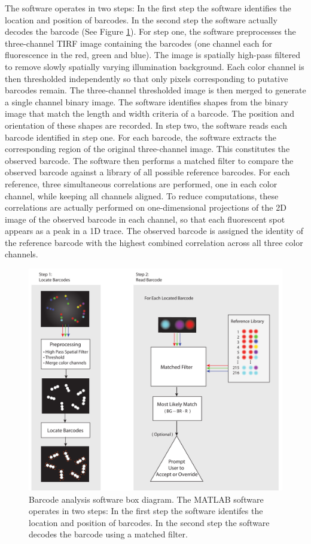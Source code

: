The software operates in two steps: In the first step the software identifies the location and position of barcodes. In the second step the software actually decodes the barcode (See Figure \ref{fig:dna_MatlabBlockDiagram}). For step one, the software preprocesses the three-channel TIRF image containing the barcodes (one channel each for fluorescence in the red, green and blue). The image is spatially high-pass filtered to remove slowly spatially varying illumination background. Each color channel is then thresholded independently so that only pixels corresponding to putative barcodes remain. The three-channel thresholded image is then merged to generate a single channel binary image. The software identifies shapes from the binary image that match the length and width criteria of a barcode. The position and orientation of these shapes are recorded. In step two, the software reads each barcode identified in step one. For each barcode, the software extracts the corresponding region of the original three-channel image. This constitutes the observed barcode. The software then performs a matched filter to compare the observed barcode against a library of all possible reference barcodes. For each reference, three simultaneous correlations are performed, one in each color channel, while keeping all channels aligned. To reduce computations, these correlations are actually performed on one-dimensional projections of the 2D image of the observed barcode in each channel, so that each fluorescent spot appears as a peak in a 1D trace. The observed barcode is assigned the identity of the reference barcode with the highest combined correlation across all three color channels. 

\begin{figure}
\includegraphics[width=\textwidth]{figures/dna_MatlabBlockDiagram}
\caption[Barcode anlaysis software]{
 Barcode analysis software box diagram. The MATLAB software operates in two steps: In the first step the software identifes the
location and position of barcodes. In the second step the software decodes the barcode  using a matched filter. 
\label{fig:dna_MatlabBlockDiagram}}
\end{figure}


